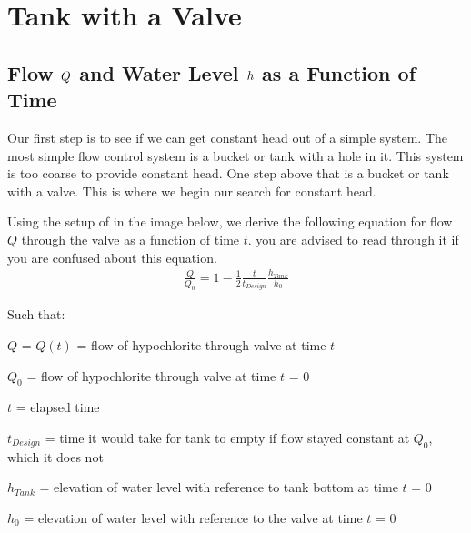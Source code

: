 \documentclass[letterpaper,10pt,english]{sphinxmanual}
\begin{document}
\section{Tank with a Valve}
\label{\detokenize{Flow_Control_and_Measurement/FCM_Design:tank-with-a-valve}}\label{\detokenize{Flow_Control_and_Measurement/FCM_Design:id1}}

\subsection{Flow \protect\(Q\protect\) and Water Level \protect\(h\protect\) as a Function of Time}
\label{\detokenize{Flow_Control_and_Measurement/FCM_Design:flow-and-water-level-as-a-function-of-time}}\label{\detokenize{Flow_Control_and_Measurement/FCM_Design:qh-as-a-function-of-t}}
Our first step is to see if we can get constant head out of a simple system. The most simple flow control system is a bucket or tank with a hole in it. This system is too coarse to provide constant head. One step above that is a bucket or tank with a valve. This is where we begin our search for constant head.

Using the setup of in the image below, we derive the following equation for flow \(Q\) through the valve as a function of time \(t\).  you are advised to read through it if you are confused about this equation.
\begin{equation}\label{equation:Flow_Control_and_Measurement/FCM_Design:Flow_Control_and_Measurement/FCM_Design:0}
\begin{split}\frac{Q}{Q_0} = 1 - \frac{1}{2} \frac{t}{t_{Design}} \frac{h_{Tank}}{h_0}\end{split}
\end{equation}
\begin{DUlineblock}{0em}
\item[] Such that:
\item[] \(Q\) = \(Q(t)\) = flow of hypochlorite through valve at time \(t\)
\item[] \(Q_0\) = flow of hypochlorite through valve at time \(t\) = 0
\item[] \(t\) = elapsed time
\item[] \(t_{Design}\) = time it would take for tank to empty if flow stayed constant at \(Q_0\), which it does not
\item[] \(h_{Tank}\) = elevation of water level with reference to tank bottom at time \(t\) = 0
\item[] \(h_0\) = elevation of water level with reference to the valve at time \(t\) = 0
\end{DUlineblock}
\end{document}
